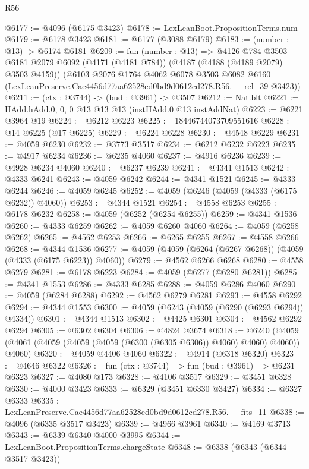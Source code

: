 \begin{lexlean}{R56}
\begin{coremodule}
@6177 := @4096 (@6175 @3423)
@6178 := LexLeanBoot.PropositionTerms.num
@6179 := @6178 @3423
@6181 := @6177 (@3088 @6179)
@6183 := (number : @13) -> @6174 @6181
@6209 := fun (number : @13) =>
  @4126
    @784
    @3503
    @6181
    @2079
    @6092
    (@4171 (@4181 @784))
    (@4187 (@4188 (@4189 @2079) @3503 @4159))
    (@6103
      @2076
      @1764
      @4062
      @6078
      @3503
      @6082
      @6160
      (LexLeanPreserve.Cae4456d77aa62528ed0bd9d0612cd278.R56.__rel_39 @3423))
@6211 := (ctx : @3744) -> (bud : @3961) -> @3507
@6212 := Nat.blt
@6221 := HAdd.hAdd.{0, 0, 0} @13 @13 @13 (instHAdd.{0} @13 instAddNat)
@6223 := @6221 @3964 @19
@6224 := @6212 @6223
@6225 := 18446744073709551616
@6228 := @14 @6225 (@17 @6225)
@6229 := @6224 @6228
@6230 := @4548 @6229
@6231 := @4059 @6230
@6232 := @3773 @3517
@6234 := @6212 @6232 @6223
@6235 := @4917 @6234
@6236 := @6235 @4060
@6237 := @4916 @6236
@6239 := @4928 @6234 @4060
@6240 := @6237 @6239
@6241 := @4341 @1513
@6242 := @4333 @6241
@6243 := @4059 @6242
@6244 := @4341 @1521
@6245 := @4333 @6244
@6246 := @4059 @6245
@6252 := @4059 (@6246 (@4059 (@4333 (@6175 @6232)) @4060))
@6253 := @4344 @1521
@6254 := @4558 @6253
@6255 := @6178 @6232
@6258 := @4059 (@6252 (@6254 @6255))
@6259 := @4341 @1536
@6260 := @4333 @6259
@6262 := @4059 @6260 @4060
@6264 := @4059 (@6258 @6262)
@6265 := @4562 @6253
@6266 := @6265 @6255
@6267 := @4558 @6266
@6268 := @4344 @1536
@6277 := @4059 (@4059 (@6264 (@6267 @6268)) (@4059 (@4333 (@6175 @6223)) @4060))
@6279 := @4562 @6266 @6268
@6280 := @4558 @6279
@6281 := @6178 @6223
@6284 := @4059 (@6277 (@6280 @6281))
@6285 := @4341 @1553
@6286 := @4333 @6285
@6288 := @4059 @6286 @4060
@6290 := @4059 (@6284 @6288)
@6292 := @4562 @6279 @6281
@6293 := @4558 @6292
@6294 := @4344 @1553
@6300 := @4059 (@6243 (@4059 (@6290 (@6293 @6294)) @4334))
@6301 := @4344 @1513
@6302 := @4425 @6301
@6304 := @4562 @6292 @6294
@6305 := @6302 @6304
@6306 := @4824 @3674
@6318 := @6240 (@4059 (@4061 (@4059 (@4059 (@4059 (@6300 (@6305 @6306)) @4060) @4060) @4060)) @4060)
@6320 := @4059 @4406 @4060
@6322 := @4914 (@6318 @6320)
@6323 := @4646 @6322
@6326 := fun (ctx : @3744) => fun (bud : @3961) => @6231 @6323
@6327 := @4080 @173
@6328 := @4106 @3517
@6329 := @3451 @6328
@6330 := @4000 @3423
@6333 := @6329 (@3451 @6330 @3427)
@6334 := @6327 @6333
@6335 := LexLeanPreserve.Cae4456d77aa62528ed0bd9d0612cd278.R56.__fits_11
@6338 := @4096 (@6335 @3517 @3423)
@6339 := @4966 @3961
@6340 := @4169 @3713
@6343 := @6339 @6340 @4000 @3995
@6344 := LexLeanBoot.PropositionTerms.chargeState
@6348 := @6338 (@6343 (@6344 @3517 @3423))

\end{coremodule}
\end{lexlean}
